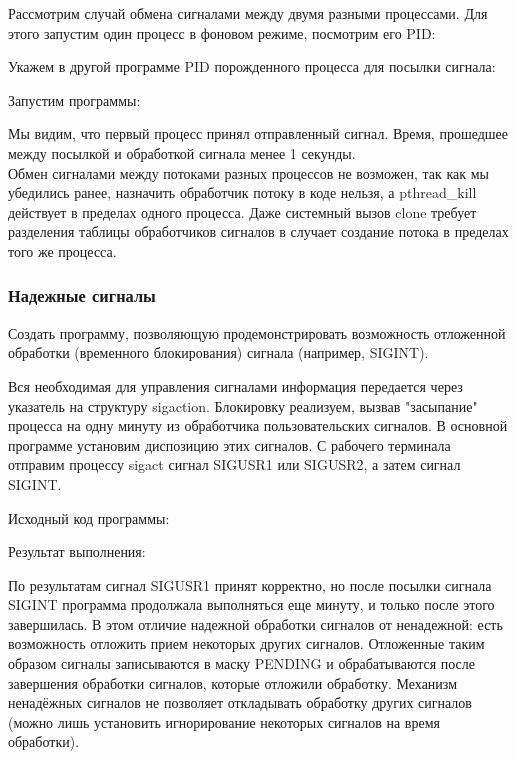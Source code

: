 \documentclass[a4paper]{article}
\begin{document}
	Рассмотрим случай обмена сигналами между двумя разными процессами. Для этого запустим один процесс в фоновом режиме, посмотрим его PID:	
	

	Укажем в другой программе PID порожденного процесса для посылки сигнала:
	
	
	Запустим программы:
	
	
	Мы видим, что первый процесс принял отправленный сигнал. Время, прошедшее между посылкой и обработкой сигнала менее 1 секунды.\\
	
	Обмен сигналами между потоками разных процессов не возможен, так как мы убедились ранее, назначить обработчик потоку в коде нельзя, а pthread\_kill действует в пределах одного процесса. Даже системный вызов clone  требует разделения таблицы обработчиков сигналов в случает создание потока в пределах того же процесса.
	
	\subsubsection{Надежные сигналы}
	Создать программу, позволяющую продемонстрировать возможность отложенной обработки (временного блокирования) сигнала (например, SIGINT).
	
	Вся необходимая для управления сигналами информация передается через указатель на структуру sigaction. Блокировку реализуем, вызвав "засыпание" процесса на одну минуту из обработчика пользовательских сигналов. В основной программе установим диспозицию этих сигналов. С рабочего терминала отправим процессу sigact сигнал SIGUSR1 или SIGUSR2, а затем сигнал SIGINT.
	
	Исходный код программы:
	
	
	Результат выполнения:
	


	По результатам сигнал SIGUSR1 принят корректно, но после посылки сигнала SIGINT программа продолжала выполняться еще минуту, и только после этого завершилась. В этом отличие надежной обработки сигналов от ненадежной: есть возможность отложить прием некоторых других сигналов. Отложенные таким образом сигналы записываются в маску PENDING и обрабатываются после завершения обработки сигналов, которые отложили обработку. Механизм ненадёжных сигналов не позволяет откладывать обработку других сигналов (можно лишь установить игнорирование некоторых сигналов на время обработки).
	
\end{document}
